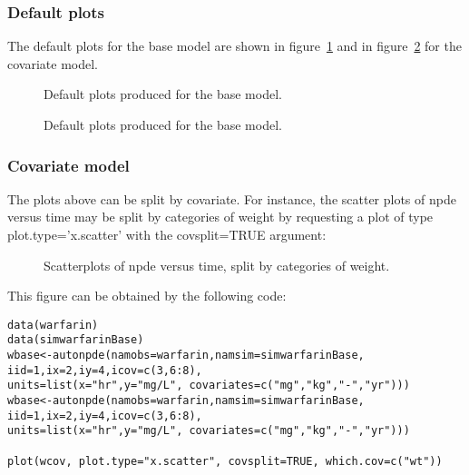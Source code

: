 \subsubsection{Default plots}

\hskip 18pt The default plots for the base model are shown in figure~\ref{fig:warfDefault} and in figure~\ref{fig:warfCovDefault} for the covariate model.

\begin{figure}[!h]
\par\kern -0.2cm
\begin{center}
\end{center}
\caption{Default plots produced for the base model.}\label{fig:warfDefault}
\end{figure}

\begin{figure}[!h]
\par\kern -0.2cm
\begin{center}
\end{center}
\caption{Default plots produced for the base model.}\label{fig:warfCovDefault}
\end{figure}

\subsubsection{Covariate model}

\hskip 18pt The plots above can be split by covariate. For instance, the scatter plots of npde versus time may be split by categories of weight by requesting a plot of type {\sf plot.type='x.scatter'} with the {\sf covsplit=TRUE} argument:

\begin{figure}[!h]
\begin{center}
\end{center}
\caption{Scatterplots of npde versus time, split by categories of weight.}\label{fig:warfCovsplitXScatter}
\end{figure}

This figure can be obtained by the following code:
\begin{verbatim}
data(warfarin)
data(simwarfarinBase)
wbase<-autonpde(namobs=warfarin,namsim=simwarfarinBase, iid=1,ix=2,iy=4,icov=c(3,6:8),
units=list(x="hr",y="mg/L", covariates=c("mg","kg","-","yr")))
wbase<-autonpde(namobs=warfarin,namsim=simwarfarinBase, iid=1,ix=2,iy=4,icov=c(3,6:8),
units=list(x="hr",y="mg/L", covariates=c("mg","kg","-","yr")))

plot(wcov, plot.type="x.scatter", covsplit=TRUE, which.cov=c("wt"))
\end{verbatim} 

